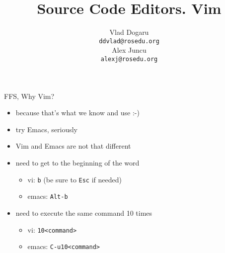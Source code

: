\documentclass{beamer}
\title[]{Source Code Editors. Vim}
\institute[CDL 2013]{ROSEdu}
\author[]{Vlad Dogaru \\ \texttt{ddvlad@rosedu.org} \\ Alex Juncu \\
\texttt{alexj@rosedu.org}}
\begin{document}
\maketitle

\tableofcontents

\begin{frame}{FFS, Why Vim?}
  \begin{itemize}
    \pause
    \item because that's what we know and use :-)
    \pause
    \item try Emacs, seriously
    \pause
    \item Vim and Emacs are not that different
    \pause
    \item need to get to the beginning of the word
    \begin{itemize}
      \item vi: \texttt{b} (be sure to \texttt{Esc} if needed)
      \item emacs: \texttt{Alt-b}
    \end{itemize}
    \item need to execute the same command 10 times
    \begin{itemize}
      \item vi: \texttt{10<command>}
      \item emacs: \texttt{C-u10<command>}
    \end{itemize}
    \pause
  \end{itemize}
\end{frame}
\end{document}

